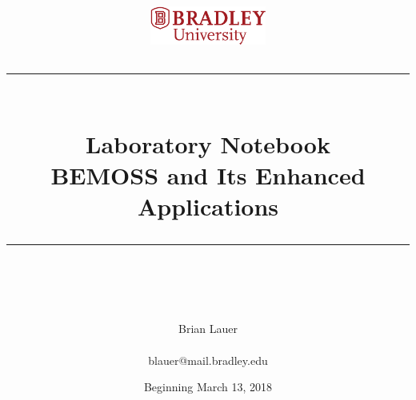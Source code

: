 \documentclass[fontsize=11pt, %
                             paper=letter, %
                             twoside, %
                             captions=tableheading,
                             index=totoc,
                             hyperref]{labbook}
\newcommand{\HRule}{\rule{\linewidth}{0.5mm}} %
\begin{document}


%

\title{
\begin{center}
\href{http://www.bradley.edu}{\includegraphics[height=0.5in]{figs/logoBU1-Print}}
\vskip10pt
\HRule \\[0.4cm]
{\Huge \bfseries Laboratory Notebook \\[0.5cm] \Large BEMOSS and Its Enhanced Applications}\\[0.4cm] %
\HRule \\[1.5cm]
\end{center}
}
\author{\Huge Brian Lauer \\ \\ \LARGE blauer@mail.bradley.edu \\[2cm]} %
\date{Beginning March 13, 2018} %
\maketitle


\printindex
\tableofcontents %
\newpage %
\end{document}

